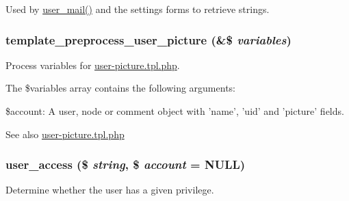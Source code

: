 Used by \hyperlink{user_8module_a1398b4fdee5dad70d6da89ce5be6c43d}{user\_\-mail()} and the settings forms to retrieve strings. \hypertarget{user_8module_aa1d7397dce93911938b4edbfee69ceb4}{
\subsubsection[{template\_\-preprocess\_\-user\_\-picture}]{\setlength{\rightskip}{0pt plus 5cm}template\_\-preprocess\_\-user\_\-picture (\&\$ {\em variables})}}
\label{user_8module_aa1d7397dce93911938b4edbfee69ceb4}
Process variables for \hyperlink{user-picture_8tpl_8php}{user-\/picture.tpl.php}.

The \$variables array contains the following arguments:
\begin{DoxyItemize}
\item \$account: A user, node or comment object with 'name', 'uid' and 'picture' fields.
\end{DoxyItemize}

\begin{DoxySeeAlso}{See also}
\hyperlink{user-picture_8tpl_8php}{user-\/picture.tpl.php} 
\end{DoxySeeAlso}
\hypertarget{user_8module_a8daa9d898b1e84225b519ee0c7fb57e0}{
\subsubsection[{user\_\-access}]{\setlength{\rightskip}{0pt plus 5cm}user\_\-access (\$ {\em string}, \/  \$ {\em account} = {\ttfamily NULL})}}
\label{user_8module_a8daa9d898b1e84225b519ee0c7fb57e0}
Determine whether the user has a given privilege.


